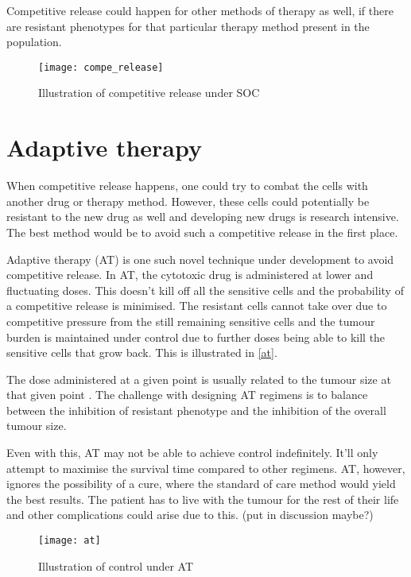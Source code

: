 Competitive release could happen for other methods of therapy as well, if there are resistant phenotypes for that particular therapy method present in the population.

\begin{figure}[h]
  \centering
  \texttt{[image: compe\_release]}
  \caption{Illustration of competitive release under SOC}
  \label{comperelease}
\end{figure}

\section{Adaptive therapy}
When competitive release happens, one could try to combat the cells with another drug or therapy method. However, these cells could potentially be resistant to the new drug as well and developing new drugs is research intensive. The best method would be to avoid such a competitive release in the first place.

Adaptive therapy (AT) is one such novel technique under development to avoid competitive release. In AT, the cytotoxic drug is administered at lower and fluctuating doses. This doesn't kill off all the sensitive cells and the probability of a competitive release is minimised. The resistant cells cannot take over due to competitive pressure from the still remaining sensitive cells and the tumour burden is maintained under control due to further doses being able to kill the sensitive cells that grow back. This is illustrated in \autoref{at}.

The dose administered at a given point is usually related to the tumour size at that given point \cite{Gatenby}. The challenge with designing AT regimens is to balance between the inhibition of resistant phenotype and the inhibition of the overall tumour size.

Even with this, AT may not be able to achieve control indefinitely. It'll only attempt to maximise the survival time compared to other regimens.
AT, however, ignores the possibility of a cure, where the standard of care method would yield the best results. The patient has to live with the tumour for the rest of their life and other complications could arise due to this.
(put in discussion maybe?)

\begin{figure}[h]
  \centering
  \texttt{[image: at]}
  \caption{Illustration of control under AT}
  \label{at}
\end{figure}

